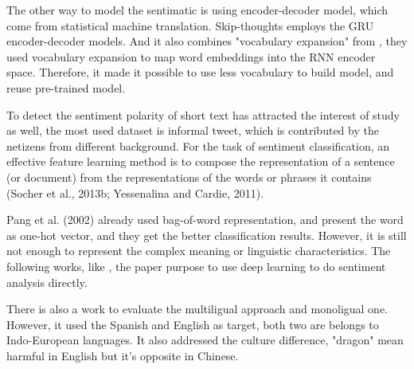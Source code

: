 The other way to model the sentimatic is using encoder-decoder model, which come from statistical machine translation. Skip-thoughts\cite{kiros2015skip} employs the GRU encoder-decoder models.
And it also combines "vocabulary expansion" from \cite{DBLP:journals/corr/MikolovLS13}, they used vocabulary expansion to map word embeddings into the RNN encoder space.
Therefore, it made it possible to use less vocabulary to build model, and reuse pre-trained model.

To detect the sentiment polarity of short text has attracted the interest of study as well, the most used dataset is informal tweet, which is contributed by the netizens from different background. 
For the task of sentiment classification, an effective feature learning method is to compose the representation of a
sentence (or document) from the representations of the words or phrases it contains (Socher et al., 2013b; Yessenalina and Cardie, 2011).

Pang et al. (2002)\cite{pang2002thumbs} already used bag-of-word representation, and present the word as one-hot vector, and they get the better classification results. However, it is still not enough to represent the complex meaning or linguistic characteristics.
The following works, like \cite{tang2014learning}, the paper purpose to use deep learning to do sentiment analysis directly.

There is also a work\cite{multilingual} to evaluate the multiligual approach and monoligual one. However, it used the Spanish and English as target, both two are belongs 
to Indo-European languages. It also addressed the culture difference, "dragon" mean harmful in English but it's opposite in Chinese. 
